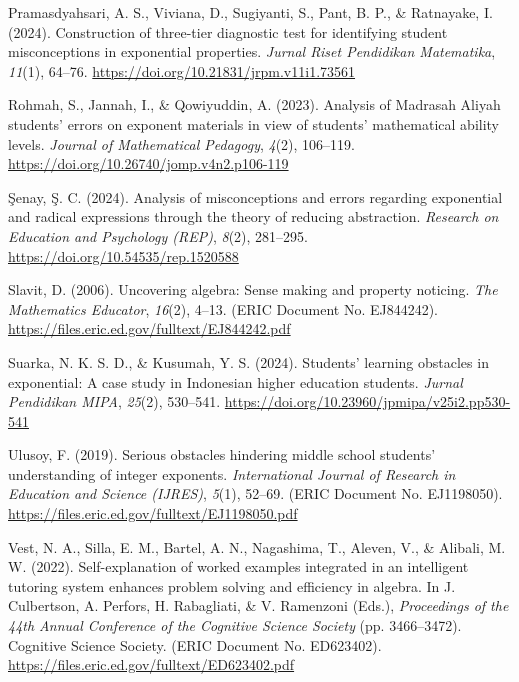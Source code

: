 \documentclass[a4paper,12pt]{article}
\begin{document}
{\hangindent=0.85cm
Pramasdyahsari, A. S., Viviana, D., Sugiyanti, S., Pant, B. P., \& Ratnayake, I. (2024). Construction of three-tier diagnostic test for identifying student misconceptions in exponential properties. \textit{Jurnal Riset Pendidikan Matematika}, \textit{11}(1), 64--76. \url{https://doi.org/10.21831/jrpm.v11i1.73561}

\hangindent=0.85cm
Rohmah, S., Jannah, I., \& Qowiyuddin, A. (2023). Analysis of Madrasah Aliyah students' errors on exponent materials in view of students' mathematical ability levels. \textit{Journal of Mathematical Pedagogy}, \textit{4}(2), 106--119. \url{https://doi.org/10.26740/jomp.v4n2.p106-119}

\hangindent=0.85cm
\c{S}enay, \c{S}. C. (2024). Analysis of misconceptions and errors regarding exponential and radical expressions through the theory of reducing abstraction. \textit{Research on Education and Psychology (REP)}, \textit{8}(2), 281--295. \url{https://doi.org/10.54535/rep.1520588}

\hangindent=0.85cm
Slavit, D. (2006). Uncovering algebra: Sense making and property noticing. \textit{The Mathematics Educator}, \textit{16}(2), 4--13. (ERIC Document No. EJ844242). \url{https://files.eric.ed.gov/fulltext/EJ844242.pdf}

\hangindent=0.85cm
Suarka, N. K. S. D., \& Kusumah, Y. S. (2024). Students' learning obstacles in exponential: A case study in Indonesian higher education students. \textit{Jurnal Pendidikan MIPA}, \textit{25}(2), 530--541. \url{https://doi.org/10.23960/jpmipa/v25i2.pp530-541}

\hangindent=0.85cm
Ulusoy, F. (2019). Serious obstacles hindering middle school students' understanding of integer exponents. \textit{International Journal of Research in Education and Science (IJRES)}, \textit{5}(1), 52--69. (ERIC Document No. EJ1198050). \url{https://files.eric.ed.gov/fulltext/EJ1198050.pdf}

\hangindent=0.85cm
Vest, N. A., Silla, E. M., Bartel, A. N., Nagashima, T., Aleven, V., \& Alibali, M. W. (2022). Self-explanation of worked examples integrated in an intelligent tutoring system enhances problem solving and efficiency in algebra. In J. Culbertson, A. Perfors, H. Rabagliati, \& V. Ramenzoni (Eds.), \textit{Proceedings of the 44th Annual Conference of the Cognitive Science Society} (pp. 3466--3472). Cognitive Science Society. (ERIC Document No. ED623402). \url{https://files.eric.ed.gov/fulltext/ED623402.pdf}

}
\end{document}
